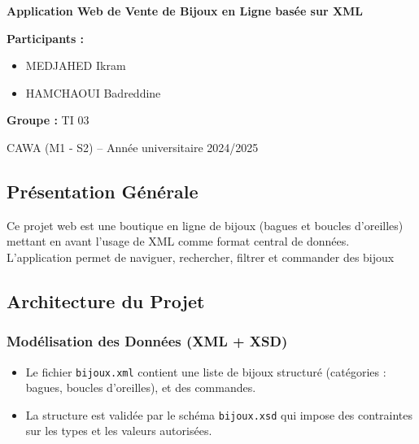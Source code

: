 \documentclass[14pt]{extarticle}
\begin{document}
\begin{titlepage}
    \vspace{4cm}

  \begin{center}
 
   \begin{spacing}{1.5}
    {\Large \bfseries Application Web de Vente de Bijoux en Ligne basée sur XML}
\end{spacing}


        \vspace{1.5cm}
  \end{center}
     
\vspace{5cm}
        \textbf{Participants :}  
        \begin{itemize}[label=-]
            \item MEDJAHED Ikram
            \item HAMCHAOUI Badreddine
        \end{itemize}

        \textbf{Groupe :} TI 03 \\
\begin{center}
    \vspace{1.5cm}
        { CAWA (M1 - S2) – Année universitaire 2024/2025} \\
\end{center}
    \vfill
\end{titlepage}

\subsection*{Présentation Générale}
Ce projet web est une boutique en ligne de bijoux (bagues et boucles d’oreilles) mettant en avant l’usage de XML comme format central de données. L'application permet de naviguer, rechercher, filtrer et commander des bijoux

\subsection*{Architecture du Projet}
\subsubsection*{Modélisation des Données (XML + XSD)}
\begin{itemize}[label=-]
    \item Le fichier \texttt{bijoux.xml} contient une liste de bijoux structuré (catégories : bagues, boucles d’oreilles), et des commandes.
    \item La structure est validée par le schéma \texttt{bijoux.xsd} qui impose des contraintes sur les types et les valeurs autorisées.
\end{itemize}
\end{document}
